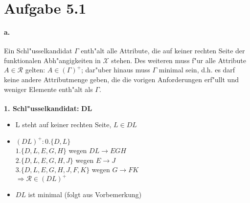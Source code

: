 \documentclass{article}
\begin{document}
	
	
	
	\section*{Aufgabe 5.1}
		\paragraph*{a.} Ein Schl"usselkandidat $ \Gamma $ enth"alt alle Attribute, die auf keiner rechten Seite der funktionalen Abh"angigkeiten in $ \mathcal{X} $ stehen. Des weiteren muss f"ur alle Attribute $A \in \mathcal{R} $ gelten: $ A \in (\Gamma)^+ $; dar"uber hinaus muss $ \Gamma $ minimal sein, d.h. es darf keine andere Attributmenge geben, die die vorigen Anforderungen erf"ullt und weniger Elemente enth"alt als $ \Gamma $.\\\\[1.2em] 
		\textbf{1. Schl"usselkandidat: }$ \mathbf{DL }$\\
		\begin{itemize}
			\item L steht auf keiner rechten Seite, $ L \in DL $ \checkmark
			\item $ (DL)^+: 0. \{D,L\} $\\
			$ 1. \{D,L,E,G,H\} $ \hspace*{20mm}wegen $ DL \rightarrow EGH $\\
			$ 2. \{D,L,E,G,H,J\} $ \hspace*{17mm}wegen $ E \rightarrow J $\\
			$ 3. \{D,L,E,G,H,J,F,K\} $ \hspace*{9mm}wegen $ G \rightarrow FK $\\
			$ \Rightarrow \mathcal{R} \in (DL)^+$ \checkmark
			\item $ DL $ ist minimal (folgt aus Vorbemerkung) \checkmark
		\end{itemize}
		
			
\end{document}
